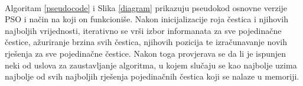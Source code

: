 \documentclass[12pt, a4paper]{article}
\begin{document}
~\\

Algoritam \ref{pseudocode} i Slika \ref{diagram} prikazuju pseudokod osnovne verzije PSO i način na koji on funkcioniše. Nakon inicijalizacije roja čestica i njihovih najboljih vrijednosti, iterativno se vrši izbor informanata za sve pojedinačne čestice, ažuriranje brzina svih čestica, njihovih pozicija te izračunavanje novih rješenja za sve pojedinačne čestice. Nakon toga provjerava se da li je ispunjen neki od uslova za zaustavljanje algoritma, u kojem slučaju se kao najbolje uzima najbolje od svih najboljih rješenja pojedinačnih čestica koji se nalaze u memoriji.

~\\

\begin{figure}[H]
  \centering
\end{figure}
\end{document}
